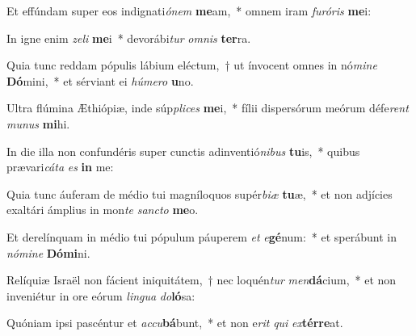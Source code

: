 \item Et effúndam super eos indignati\textit{ó}\textit{nem} \textbf{me}am,~* omnem iram \textit{fu}\textit{ró}\textit{ris} \textbf{me}i:
\item In igne enim \textit{ze}\textit{li} \textbf{me}i~* devorábi\textit{tur} \textit{om}\textit{nis} \textbf{ter}ra.
\item Quia tunc reddam pópulis lábium eléctum,~† ut ínvocent omnes in nó\textit{mi}\textit{ne} \textbf{Dó}mini,~* et sérviant ei \textit{hú}\textit{me}\textit{ro} \textbf{u}no.
\item Ultra flúmina Æthiópiæ, inde súp\textit{pli}\textit{ces} \textbf{me}i,~* fílii dispersórum meórum défe\textit{rent} \textit{mu}\textit{nus} \textbf{mi}hi.
\item In die illa non confundéris super cunctis adinventió\textit{ni}\textit{bus} \textbf{tu}is,~* quibus prævari\textit{cá}\textit{ta} \textit{es} \textbf{in} me:
\item Quia tunc áuferam de médio tui magníloquos supér\textit{bi}\textit{æ} \textbf{tu}æ,~* et non adjícies exaltári ámplius in mon\textit{te} \textit{sanc}\textit{to} \textbf{me}o.
\item Et derelínquam in médio tui pópulum páuperem \textit{et} \textit{e}\textbf{gé}num:~* et sperábunt in \textit{nó}\textit{mi}\textit{ne} \textbf{Dó}\textbf{mi}ni.
\item Relíquiæ Israël non fácient iniquitátem,~† nec loquén\textit{tur} \textit{men}\textbf{dá}cium,~* et non inveniétur in ore eórum \textit{lin}\textit{gua} \textit{do}\textbf{ló}sa:
\item Quóniam ipsi pascéntur et \textit{ac}\textit{cu}\textbf{bá}bunt,~* et non e\textit{rit} \textit{qui} \textit{ex}\textbf{tér}\textbf{re}at.
